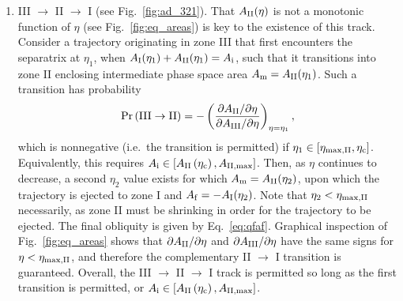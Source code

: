 \documentclass[twocolumn,twocolappendix]{aastex63}
\newcommand*{\pdil}[2]{\partial#1 / \partial#2}
\newcommand*{\p}[1]{\left(#1\right)}
\newcommand*{\s}[1]{\left[#1\right]}
\begin{document}
\begin{enumerate}
    \item III $\to$ II $\to$ I (see Fig.~\ref{fig:ad_321}). That $A_{\rm
        II}(\eta)$ is not a monotonic function of $\eta$ (see
        Fig.~\ref{fig:eq_areas}) is key to the existence of this track. Consider
        a trajectory originating in zone III that first encounters the
        separatrix at $\eta_1$, when $A_{\rm I}(\eta_1) + A_{\rm II}(\eta_1) =
        A_{\rm i}$, such that it transitions into zone II enclosing intermediate
        phase space area $A_{\rm m} = A_{\rm II}(\eta_1)$. Such a transition has
        probability
        \begin{equation}
            \Pr\p{\rm III \to II} = -\p{
                \frac{\pdil{A_{\rm II}}{\eta}}{\pdil{A_{\rm III}}{\eta}}}
                    _{\eta = \eta_1},
        \end{equation}
        which is nonnegative (i.e.\ the transition is permitted) if $\eta_1 \in
        [\eta_{\rm \max, II}, \eta_{\rm c}]$. Equivalently, this requires
        $A_{\rm i} \in \s{A_{\rm II}\p{\eta_{\rm c}} , A_{\rm II, \max}}$. Then,
        as $\eta$ continues to decrease, a second $\eta_2$ value exists for
        which $A_{\rm m} = A_{\rm II}(\eta_2)$, upon which the trajectory is
        ejected to zone I and $A_{\rm f} = -A_{\rm I}(\eta_2)$. Note that
        $\eta_2 < \eta_{\rm \max, II}$ necessarily, as zone II must be shrinking
        in order for the trajectory to be ejected. The final obliquity is given
        by Eq.~\eqref{eq:qfaf}. Graphical inspection of Fig.~\ref{fig:eq_areas}
        shows that $\pdil{A_{\rm II}}{\eta}$ and $\pdil{A_{\rm III}}{\eta}$ have
        the same signs for $\eta < \eta_{\rm \max, II}$, and therefore the
        complementary II $\to$ I transition is guaranteed. Overall, the III
        $\to$ II $\to$ I track is permitted so long as the first transition is
        permitted, or $A_{\rm i} \in \s{A_{\rm II}\p{\eta_{\rm c}} , A_{\rm II,
        \max}}$.


\end{enumerate}
\end{document}
